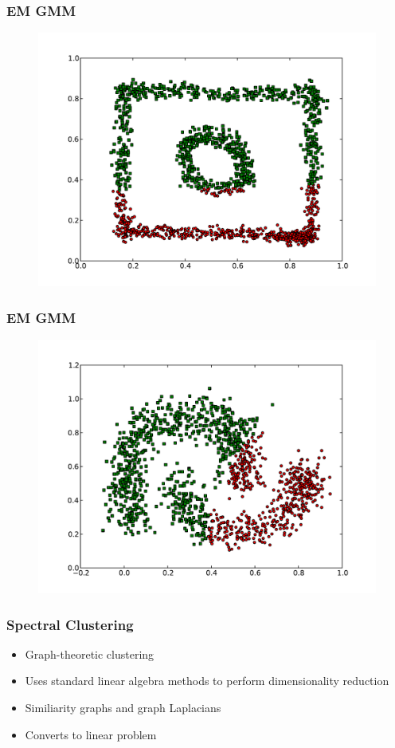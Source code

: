 \documentclass{beamer}
\begin{document}
\begin{frame}
\frametitle{EM GMM}
    \begin{figure}[]
    \includegraphics[scale=0.5]{GMM_circle-weird.pdf}
    \end{figure}
\end{frame}

\begin{frame}
\frametitle{EM GMM}
    \begin{figure}[]
    \includegraphics[scale=0.5]{GMM_half-moons.pdf}
    \end{figure}
\end{frame}



\begin{frame}
\frametitle{Spectral Clustering}
    \begin{itemize}
	\item Graph-theoretic clustering
    	\item Uses standard linear algebra methods to perform dimensionality reduction
   	\item Similiarity graphs and graph Laplacians
   	\item Converts to linear problem
    \end{itemize}
\end{frame}
\end{document}
